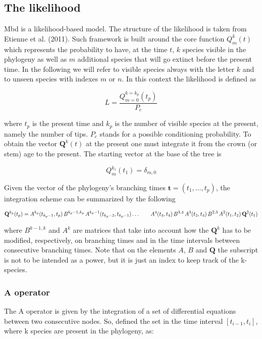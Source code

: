 \documentclass[]{article}
\begin{document}
\hypertarget{the-likelihood}{%
\subsection{The likelihood}\label{the-likelihood}}

Mbd is a likelihood-based model. The structure of the likelihood is taken from
Etienne et al. (2011). Such framework is built around the core function
\(Q_{m}^{k}(t)\) which represents the probability to have, at the time \(t\), \(k\)
species visible in the phylogeny as well as \(m\) additional species that will
go extinct before the present time. In the following we will refer to visible
species always with the letter \(k\) and to unseen species with indexes \(m\)
or \(n\).
In this context the likelihood is defined as

\[
L = \frac{Q_{m = 0}^{k = k_{p}}(t_{p})}{P_c}
\]

where \(t_p\) is the present time and \(k_p\) is the number of visible species at
the present, namely the number of tips. \(P_c\) stands for a possible conditioning
probability.
To obtain the vector \(\mathbf{Q}^k(t)\) at the present one must integrate it from
the crown (or stem) age to the present. The starting vector at the base of the
tree is

\[
Q_{m}^{k_{1}}(t_{1}) = \delta_{m,0}
\]

Given the vector of the phylogeny's branching times
\(\mathbf{t} = (t_1, \dots, t_p)\), the integration scheme can be
summarized by the following

\[
 \mathbf{Q}^{k_p}(t_p) = A^{k_p}(t_{k_p-1},t_p)\, B^{k_p-1,k_p}\,
    A^{k_p-1}(t_{k_p-2},t_{k_p-1}) \ldots \notag \\
 \qquad A^{4}(t_3,t_4)\,B^{3,4}\,A^{3}(t_2,t_3)\,
    B^{2,3}\, A^{2}(t_1,t_2)\, \mathbf{Q}^2(t_1)
\]

where \(B^{k - 1, k}\) and \(A^k\) are matrices that take into account how
the \(\mathbf{Q}^k\) has to be modified, respectively, on branching times and in
the time intervals between consecutive branching times. Note that on the
elements \(A\), \(B\) and \(\mathbf{Q}\) the subscript is not to be intended as a
power, but it is just an index to keep track of the k-species.

\hypertarget{a-operator}{%
\subsubsection{A operator}\label{a-operator}}

The A operator is given by the integration of a set of differential equations
between two consecutive nodes. So, defined the set in the time interval
\([t_{i-1}, t_i]\), where k species are present in the phylogeny, as:
\end{document}
